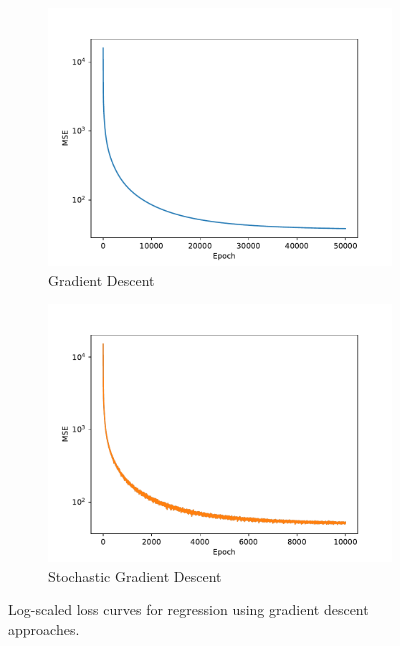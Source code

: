 \documentclass{article}
\begin{document}
\begin{figure}
    \centering
    \begin{subfigure}{.49\linewidth}
        \centering
        \includegraphics[width=\linewidth]{Figures/gd-loss.pdf}
        \caption{Gradient Descent}
    \end{subfigure}
    \begin{subfigure}{.49\linewidth}
        \centering
        \includegraphics[width=\linewidth]{Figures/sgd-loss.pdf}
        \caption{Stochastic Gradient Descent}
    \end{subfigure}
    \caption{Log-scaled loss curves for regression using gradient descent approaches.}
    \label{fig:gd-loss}
\end{figure}
\end{document}
